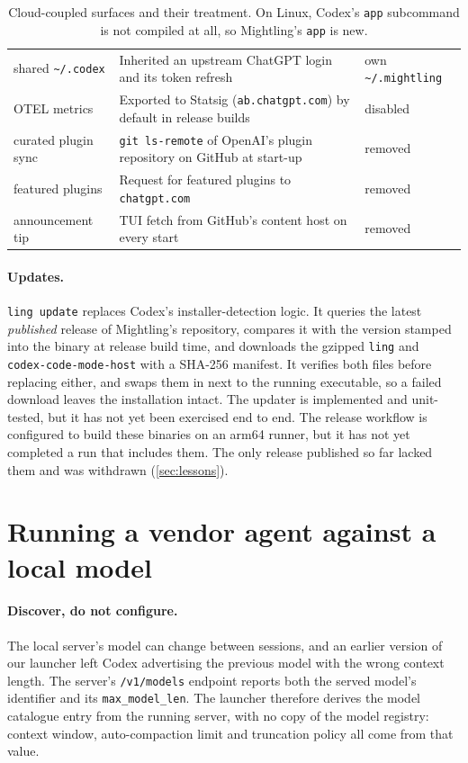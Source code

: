 \documentclass[11pt]{article}
\newcommand{\code}[1]{\texttt{#1}}
\begin{document}
\begin{table}[t]
\begin{tabularx}{\linewidth}{@{}l X l@{}}
shared \code{\textasciitilde/.codex} & Inherited an upstream ChatGPT login and its token refresh & own \code{\textasciitilde/.mightling} \\
OTEL metrics & Exported to Statsig (\code{ab.chatgpt.com}) by default in release builds & disabled \\
curated plugin sync & \code{git ls-remote} of OpenAI's plugin repository on GitHub at start-up & removed \\
featured plugins & Request for featured plugins to \code{chatgpt.com} & removed \\
announcement tip & TUI fetch from GitHub's content host on every start & removed \\
\bottomrule
\end{tabularx}
\caption{Cloud-coupled surfaces and their treatment. On Linux, Codex's \code{app} subcommand is
not compiled at all, so Mightling's \code{app} is new.}
\label{tab:cloud}
\end{table}

\paragraph{Updates.} \code{ling update} replaces Codex's installer-detection logic. It queries the
latest \emph{published} release of Mightling's repository, compares it with the version stamped into
the binary at release build time, and downloads the gzipped \code{ling} and
\code{codex-code-mode-host} with a SHA-256 manifest. It verifies both files before replacing either,
and swaps them in next to the running executable, so a failed download leaves the installation
intact. The updater is implemented and unit-tested, but it has not yet been exercised end to end.
The release workflow is configured to build these binaries on an arm64 runner, but it has not yet
completed a run that includes them. The only release published so far lacked them and was
withdrawn (\cref{sec:lessons}).

\section{Running a vendor agent against a local model}
\label{sec:local}

\paragraph{Discover, do not configure.} The local server's model can change between sessions, and
an earlier version of our launcher left Codex advertising the previous model with the wrong context
length. The server's \code{/v1/models} endpoint reports both the served model's identifier and its
\code{max\_model\_len}. The launcher therefore derives the model catalogue entry from the running
server, with no copy of the model registry: context window, auto-compaction limit and truncation
policy all come from that value.
\end{document}
